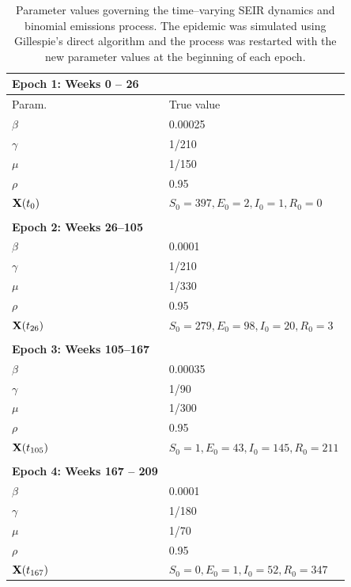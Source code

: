 \begin{table}[htbp]
	\centering
	\begin{tabular}{ll}
		\textbf{Epoch 1: Weeks 0 -- 26} & \\
		\hline\hline
		Param. & True value \\ 
		\hline
		$ \beta $ &  0.00025 \\
		$ \gamma $ & 1/210\\
		$ \mu $ &  1/150 \\ 
		$ \rho $ &  0.95 \\
		$ \mathbf{X}(t_0) $ &  $ S_0 = 397, E_0 = 2, I_0 = 1, R_0 =0 $  \\ 
		\hline	
		&\\
		\textbf{Epoch 2: Weeks 26--105} & \\
		\hline\hline
		$ \beta $ &  0.0001 \\
		$ \gamma $ & 1/210\\
		$ \mu $ &  1/330 \\ 
		$ \rho $ &  0.95 \\
		$ \mathbf{X}(t_{26}) $ &  $ S_0 = 279, E_0 = 98, I_0 = 20, R_0 =3 $  \\ 
		\hline
		&\\
		\textbf{Epoch 3: Weeks 105--167} & \\
		\hline\hline
		$ \beta $ &  0.00035 \\
		$ \gamma $ & 1/90\\
		$ \mu $ &  1/300 \\ 
		$ \rho $ &  0.95 \\
		$ \mathbf{X}(t_{105}) $ &  $ S_0 = 1, E_0 = 43, I_0 = 145, R_0 =211 $  \\ 
		\hline
		&\\
		\textbf{Epoch 4: Weeks 167 -- 209} & \\
		\hline\hline
		$ \beta $ &  0.0001 \\
		$ \gamma $ & 1/180\\
		$ \mu $ &  1/70 \\ 
		$ \rho $ &  0.95 \\
		$ \mathbf{X}(t_{167}) $ &  $ S_0 = 0, E_0 = 1, I_0 = 52, R_0 = 347 $\\
		\hline
	\end{tabular}
	\caption{Parameter values governing the time--varying SEIR dynamics and binomial emissions process. The epidemic was simulated using Gillespie's direct algorithm and the process was restarted with the new parameter values at the beginning of each epoch.}
	\label{tab:misspec_sim_params}
\end{table}

